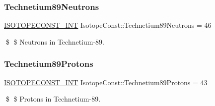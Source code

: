 \subsubsection{\texorpdfstring{Technetium89\+Neutrons}{Technetium89Neutrons}}
{\footnotesize\ttfamily \mbox{\hyperlink{group___isotope_const-_macros_ga5f18360b3e99483a35c32d789e62621c}{I\+S\+O\+T\+O\+P\+E\+C\+O\+N\+S\+T\+\_\+\+I\+NT}} Isotope\+Const\+::\+Technetium89\+Neutrons = 46}

\$ \$ Neutrons in Technetium-\/89. \mbox{\label{group___isotope_const-_technetium-_tc89_ga3500dfc4f45ffb0ce01446bc738e90ca}} 
\subsubsection{\texorpdfstring{Technetium89\+Protons}{Technetium89Protons}}
{\footnotesize\ttfamily \mbox{\hyperlink{group___isotope_const-_macros_ga5f18360b3e99483a35c32d789e62621c}{I\+S\+O\+T\+O\+P\+E\+C\+O\+N\+S\+T\+\_\+\+I\+NT}} Isotope\+Const\+::\+Technetium89\+Protons = 43}

\$ \$ Protons in Technetium-\/89. 